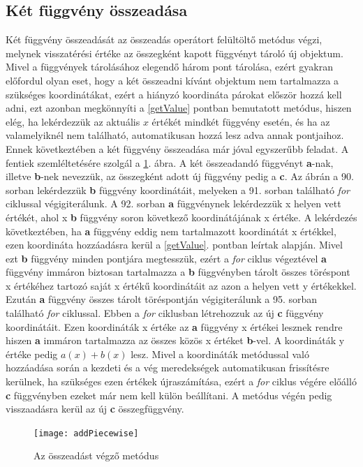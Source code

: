 \subsection{Két függvény összeadása} \label{addPiecewiseLinearFunction}
Két függvény összeadását az összeadás operátort felültöltő metódus végzi, melynek visszatérési értéke az összegként kapott függvényt tároló új  objektum.
Mivel a függvények tárolásához elegendő három pont tárolása, ezért gyakran előfordul olyan eset, hogy a két összeadni kívánt  objektum nem tartalmazza a szükséges koordinátákat, ezért a hiányzó koordináta párokat először hozzá kell adni, ezt azonban megkönnyíti a \ref{getValue} pontban bemutatott metódus, hiszen elég, ha lekérdezzük az aktuális $x$ értékét mindkét függvény esetén, és ha az valamelyiknél nem található, automatikusan hozzá lesz adva annak pontjaihoz.
Ennek következtében a két függvény összeadása már jóval egyszerűbb feladat.
A fentiek szemléltetésére szolgál a \ref{add_piecewise}. ábra.
A két összeadandó függvényt \textbf{a}-nak, illetve \textbf{b}-nek nevezzük, az összegként adott új függvény pedig a \textbf{c}.
Az ábrán a 90. sorban lekérdezzük \textbf{b} függvény koordinátáit, melyeken a 91. sorban található \textit{for} ciklussal végigiterálunk.
A 92. sorban \textbf{a} függvénynek lekérdezzük x helyen vett értékét, ahol x \textbf{b} függvény soron következő koordinátájának x értéke.
A lekérdezés következtében, ha \textbf{a} függvény eddig nem tartalmazott koordinátát x értékkel, ezen koordináta hozzáadásra kerül a \ref{getValue}. pontban leírtak alapján.
Mivel ezt \textbf{b} függvény minden pontjára megtesszük, ezért a \textit{for} ciklus végeztével \textbf{a} függvény immáron biztosan tartalmazza a \textbf{b} függvényben tárolt összes töréspont x értékéhez tartozó saját x értékű koordinátáit az azon a helyen vett y értékekkel.
Ezután \textbf{a} függvény összes tárolt töréspontján végigiterálunk a 95. sorban található \textit{for} ciklussal.
Ebben a \textit{for} ciklusban létrehozzuk az új \textbf{c} függvény koordinátáit.
Ezen koordináták x értéke az \textbf{a} függvény x értékei lesznek rendre hiszen \textbf{a} immáron tartalmazza az összes közös x értéket \textbf{b}-vel.
A koordináták y értéke pedig $a(x)+b(x)$ lesz.
Mivel a koordináták  metódussal való hozzáadása során a kezdeti és a vég meredekségek automatikusan frissítésre kerülnek, ha szükséges ezen értékek újraszámítása, ezért a \textit{for} ciklus végére előálló \textbf{c} függvényben ezeket már nem kell külön beállítani.
A metódus végén pedig visszaadásra kerül az új \textbf{c} összegfüggvény. 
\begin{figure}[H]
\begin{center}
\texttt{[image: addPiecewise]}
\caption{Az összeadást végző metódus}
\label{add_piecewise}
\end{center}
\end{figure}
